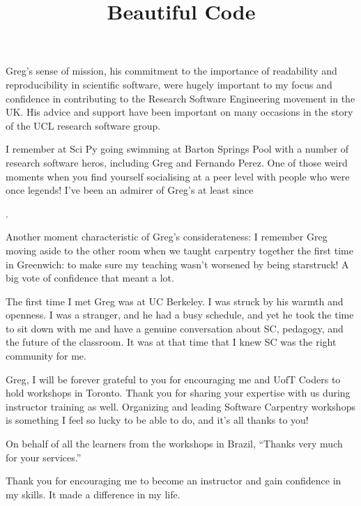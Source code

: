 \newpage

Greg's sense of mission, his commitment to the importance of readability and
reproducibility in scientific software, were hugely important to my focus and
confidence in contributing to the Research Software Engineering movement in the
UK. His advice and support have been important on many occasions in the story
of the UCL research software group.

I remember at Sci Py going swimming at Barton Springs Pool with a number of
research software heros, including Greg and Fernando Perez. One of those weird
moments when you find yourself socialising at a peer level with people who were
once legends! I've been an admirer of Greg's at least since \title{Beautiful
Code}.

Another moment characteristic of Greg's considerateness: I remember Greg moving
aside to the other room when we taught carpentry together the first time in
Greenwich: to make sure my teaching wasn't worsened by being starstruck! A big
vote of confidence that meant a lot.


\newpage

The first time I met Greg was at UC Berkeley. I was struck by his warmth and
openness. I was a stranger, and he had a busy schedule, and yet he took the
time to sit down with me and have a genuine conversation about SC, pedagogy,
and the future of the classroom. It was at that time that I knew SC was the
right community for me.


\newpage
Greg, I will be forever grateful to you for encouraging me and UofT Coders to
hold workshops in Toronto. Thank you for sharing your expertise with us during
instructor training as well. Organizing and leading Software Carpentry
workshops is something I feel so lucky to be able to do, and it's all thanks to
you!


\newpage

On behalf of all the learners from the workshops in Brazil, ``Thanks very much
for your services.''


\newpage

Thank you for encouraging me to become an instructor and gain confidence in my
skills. It made a difference in my life.

